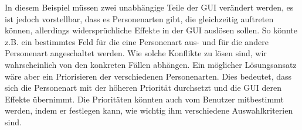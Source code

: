 In diesem Beispiel müssen zwei unabhängige Teile der GUI verändert werden, es ist jedoch vorstellbar, dass es Personenarten gibt, die gleichzeitig auftreten können, allerdings widersprüchliche Effekte in der GUI auslösen sollen. So könnte z.B. ein bestimmtes Feld für die eine Personenart aus- und für die andere Personenart angeschaltet werden. Wie solche Konflikte zu lösen sind, wir wahrscheinlich von den konkreten Fällen abhängen. Ein möglicher Lösungsansatz wäre aber ein Priorisieren der verschiedenen Personenarten. Dies bedeutet, dass sich die Personenart mit der höheren Priorität durchsetzt und die GUI deren Effekte übernimmt. Die Prioritäten könnten auch vom Benutzer mitbestimmt werden, indem er festlegen kann, wie wichtig ihm verschiedene Auswahlkriterien sind.
 














